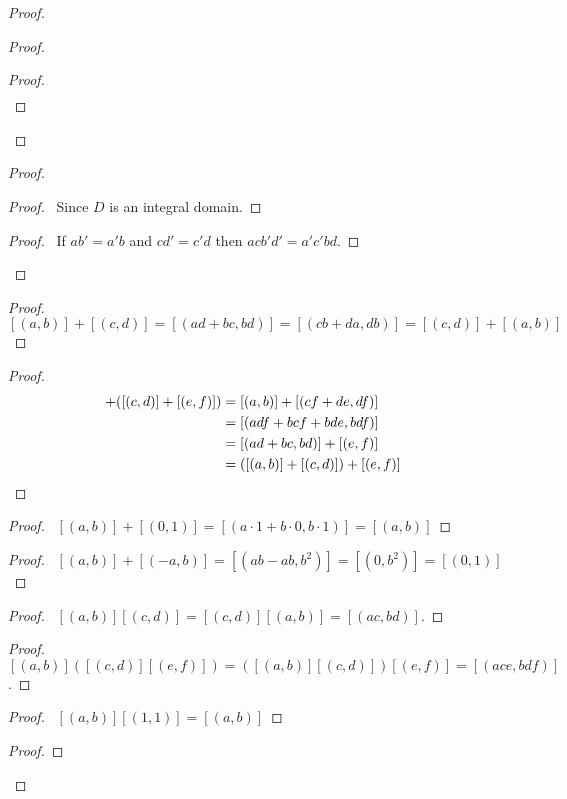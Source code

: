 \documentclass{book}
\let\qed\relax
\theoremstyle{definition}
\begin{document}
\begin{proof}
\begin{proof}
\begin{proof}
\begin{align*}
	\end{align*}
\end{proof}
\qed
\end{proof}
\begin{proof}
\pf
{}
\begin{proof}
	\pf\ Since $D$ is an integral domain.
\end{proof}
\begin{proof}
	\pf\ If $ab' = a'b$ and $cd' = c'd$ then $acb'd' = a'c'bd$.
\end{proof}
\qed
\end{proof}
\begin{proof}
\pf\ $[(a,b)] + [(c,d)] = [(ad+bc,bd)] = [(cb+da,db)] = [(c,d)] + [(a,b)]$ \qed
\end{proof}
\begin{proof}
\pf
\begin{align*}
[(a,b)] + ([(c,d)] + [(e,f)]) & = [(a,b)] + [(cf+de,df)] \\
& = [(adf + bcf + bde,bdf)] \\
& = [(ad+bc,bd)] + [(e,f)] \\
& = ([(a,b)] + [(c,d)]) + [(e,f)] & \qed
\end{align*}
\end{proof}
\begin{proof}
\pf\ $[(a,b)] + [(0,1)] = [(a \cdot 1 + b \cdot 0, b \cdot 1)] = [(a,b)]$ \qed
\end{proof}
\begin{proof}
\pf\ $[(a,b)] + [(-a,b)] = [(ab-ab,b^2)] = [(0,b^2)] = [(0,1)]$ \qed
\end{proof}
\begin{proof}
\pf\ $[(a,b)][(c,d)] = [(c,d)][(a,b)] = [(ac,bd)]$. \qed
\end{proof}
\begin{proof}
\pf\ $[(a,b)]([(c,d)][(e,f)]) = ([(a,b)][(c,d)])[(e,f)] = [(ace,bdf)]$. \qed
\end{proof}
\begin{proof}
\pf\ $[(a,b)][(1,1)] = [(a,b)]$ \qed
\end{proof}
\begin{proof}
\pf
{}
\qed
\end{proof}
\qed
\end{proof}
\end{document}
